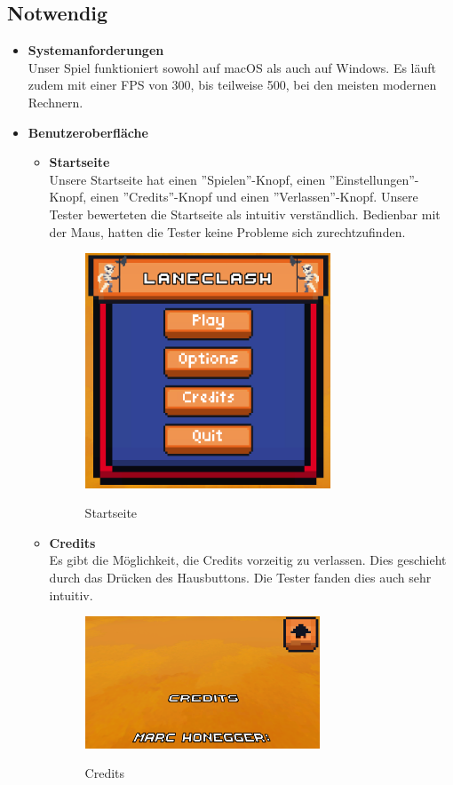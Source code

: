 \subsection{Notwendig}
    \begin{itemize}
    \item \textbf{Systemanforderungen} \\
        Unser Spiel funktioniert sowohl auf macOS als auch auf Windows. Es läuft zudem mit einer FPS von 300, bis teilweise 500, bei den meisten modernen Rechnern.
    \item \textbf{Benutzeroberfläche} \\
    \begin {itemize}
        \item \textbf{Startseite} \\
            Unsere Startseite hat einen ''Spielen''-Knopf, einen ''Einstellungen''-Knopf, einen ''Credits''-Knopf und einen ''Verlassen''-Knopf. Unsere Tester bewerteten die Startseite
            als intuitiv verständlich. Bedienbar mit der Maus, hatten die Tester keine Probleme sich zurechtzufinden.
            \begin{figure}[H]
                \centering
                \includegraphics[height=7cm]{resources/laneclash.png}\\
                \caption{Startseite}
            \end{figure}

        \item \textbf{Credits}\\
            Es gibt die Möglichkeit, die Credits vorzeitig zu verlassen. Dies geschieht durch das Drücken des Hausbuttons. Die Tester fanden dies auch sehr intuitiv.
            \begin{figure}[H]
                \centering
                \includegraphics[width = 7cm]{resources/credits.png}\\
                \caption{Credits}
            \end{figure}
            

\end{itemize}
\end{itemize}
